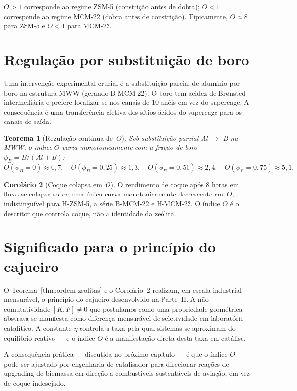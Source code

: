 \documentclass[12pt,a4paper,twoside]{book}
\theoremstyle{plain}
\newtheorem{teorema}{Teorema}[section]
\theoremstyle{definition}
\newtheorem{corolario}[teorema]{Corolário}
\theoremstyle{definition}
\newcommand{\tribo}{\eta}
\begin{document}
$O > 1$ corresponde ao regime ZSM-5 (constrição antes de dobra);
$O < 1$ corresponde ao regime MCM-22 (dobra antes de constrição).
Tipicamente, $O \approx 8$ para ZSM-5 e $O < 1$ para MCM-22.

\section{Regulação por substituição de boro}

Uma intervenção experimental crucial é a substituição parcial de
alumínio por boro na estrutura MWW (gerando B-MCM-22). O boro tem
acidez de Brønsted intermediária e prefere localizar-se nos canais de
10 anéis em vez do supercage. A consequência é uma transferência efetiva
dos sítios ácidos do supercage para os canais de saída.

\begin{teorema}[Regulação contínua de~$O$]\label{thm:boro-regula}
Sob substituição parcial Al $\to$ B na MWW, o índice $O$ varia
monotonicamente com a fração de boro $\phi_{B} = B/(Al+B)$:
\[
  O(\phi_{B} = 0) \approx 0{,}7, \quad
  O(\phi_{B} = 0{,}25) \approx 1{,}3, \quad
  O(\phi_{B} = 0{,}50) \approx 2{,}4, \quad
  O(\phi_{B} = 0{,}75) \approx 5{,}1.
\]
\end{teorema}

\begin{corolario}[Coque colapsa em~$O$]\label{cor:coque-O}
O rendimento de coque após 8 horas em fluxo se colapsa sobre uma única
curva monotonicamente decrescente em~$O$, indistinguível para
H-ZSM-5, a série B-MCM-22 e H-MCM-22. O índice $O$ é o descritor que
controla coque, não a identidade da zeólita.
\end{corolario}

\section{Significado para o princípio do cajueiro}

O Teorema~\ref{thm:ordem-zeolitas} e o Corolário~\ref{cor:coque-O}
realizam, em escala industrial mensurável, o princípio do cajueiro
desenvolvido na Parte~II. A não-comutatividade $[K,F] \ne 0$ que
postulamos como uma propriedade geométrica abstrata se manifesta como
diferença mensurável de seletividade em laboratório catalítico.
A constante $\tribo$ controla a taxa pela qual sistemas se aproximam
do equilíbrio reativo --- e o índice $O$ é a manifestação direta desta
taxa em catálise.

A consequência prática --- discutida no próximo capítulo --- é que o
índice $O$ pode ser ajustado por engenharia de catalisador para
direcionar reações de upgrading de biomassa em direção a combustíveis
sustentáveis de aviação, em vez de coque indesejado.
\end{document}
